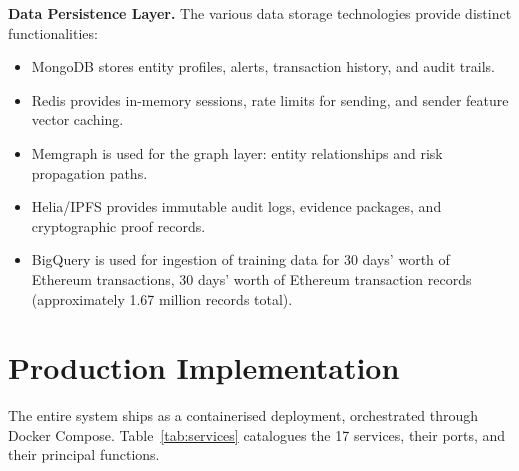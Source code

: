 \documentclass[journal]{IEEEtran}
\begin{document}
\textbf{Data Persistence Layer.} The various data storage technologies provide distinct functionalities:

\begin{itemize}
\item MongoDB stores entity profiles, alerts, transaction history, and audit trails.
\item Redis provides in-memory sessions, rate limits for sending, and sender feature vector caching.
\item Memgraph is used for the graph layer: entity relationships and risk propagation paths.
\item Helia/IPFS provides immutable audit logs, evidence packages, and cryptographic proof records.
\item BigQuery is used for ingestion of training data for 30 days' worth of Ethereum transactions, 30 days' worth of Ethereum transaction records (approximately 1.67 million records total).
\end{itemize}

\section{Production Implementation}

The entire system ships as a containerised deployment, orchestrated through Docker Compose. Table~\ref{tab:services} catalogues the 17 services, their ports, and their principal functions.
\end{document}
